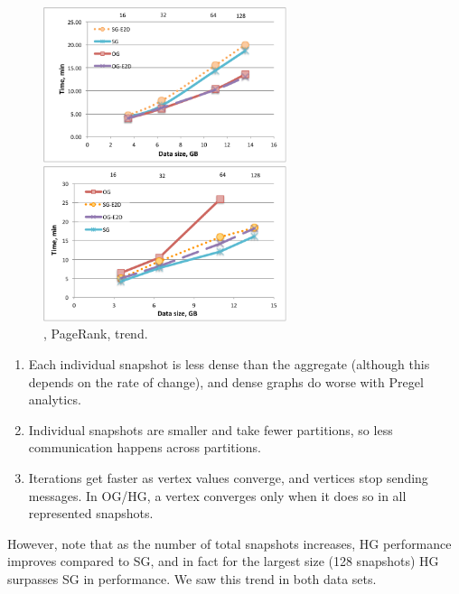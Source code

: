 \begin{figure}[t!]
\centering
\begin{minipage}{3.3in}
  \centering
  \includegraphics[width=2.8in]{figs/trend_degrees.pdf}
  \vspace{-0.1in}
  \caption{.}
  \label{fig:trend_deg}
  \vspace{-0.5cm}
\end{minipage}
\begin{minipage}{3.3in}
  \centering
\includegraphics[width=2.8in]{figs/complexq.pdf}
  \vspace{-0.1in}
\caption{, PageRank, trend.}
\label{fig:complexq}
  \vspace{-0.5cm}
\end{minipage}
\end{figure}

\begin{enumerate}[leftmargin=*]
\item Each individual snapshot is less dense than the aggregate
  (although this depends on the rate of change), and dense graphs do
  worse with Pregel analytics.
\item Individual snapshots are smaller and take fewer partitions, so
  less communication happens across partitions.
\item Iterations get faster as vertex values converge, and vertices
  stop sending messages.  In OG/HG, a vertex converges only when it
  does so in all represented snapshots.
\end{enumerate}

However, note that as the number of total snapshots increases, HG
performance improves compared to SG, and in fact for the largest size
(128 snapshots) HG surpasses SG in performance.  We saw this trend in
both data sets.

